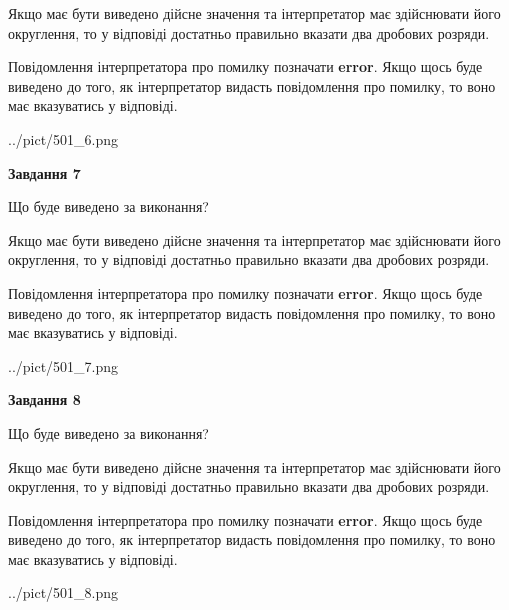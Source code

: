 \documentclass[12pt, ukrainian]{article}
\begin{document}
{\begin {Large}
Якщо має бути виведено дійсне значення та інтерпретатор має здійснювати його округлення, 
то у відповіді достатньо правильно вказати два дробових розряди.

Повідомлення інтерпретатора про помилку позначати \textbf{error}.
Якщо щось буде виведено до того, як інтерпретатор видасть повідомлення про помилку, 
то воно має вказуватись у відповіді. \par

\begin{center}
	{../pict/501_6.png}
\end{center}
\newpage

{\begin {center}\textbf{Завдання 7}\end {center}}\par
Що буде виведено за виконання? \par

Якщо має бути виведено дійсне значення та інтерпретатор має здійснювати його округлення, 
то у відповіді достатньо правильно вказати два дробових розряди.

Повідомлення інтерпретатора про помилку позначати \textbf{error}.
Якщо щось буде виведено до того, як інтерпретатор видасть повідомлення про помилку, 
то воно має вказуватись у відповіді. \par

\begin{center}
	{../pict/501_7.png}
\end{center}
\newpage

{\begin {center}\textbf{Завдання 8}\end {center}}\par
Що буде виведено за виконання? \par

Якщо має бути виведено дійсне значення та інтерпретатор має здійснювати його округлення, 
то у відповіді достатньо правильно вказати два дробових розряди.

Повідомлення інтерпретатора про помилку позначати \textbf{error}.
Якщо щось буде виведено до того, як інтерпретатор видасть повідомлення про помилку, 
то воно має вказуватись у відповіді. \par

\begin{center}
	{../pict/501_8.png}
\end{center}
\newpage


\end{Large}}
\end{document}
